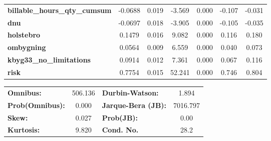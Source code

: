 \begin{center}
\begin{tabular}{lcccccc}
\textbf{billable\_hours\_qty\_cumsum}    &      -0.0688  &        0.019     &    -3.569  &         0.000        &       -0.107    &       -0.031     \\
\textbf{dnu}                             &      -0.0697  &        0.018     &    -3.905  &         0.000        &       -0.105    &       -0.035     \\
\textbf{holstebro}                       &       0.1479  &        0.016     &     9.082  &         0.000        &        0.116    &        0.180     \\
\textbf{ombygning}                       &       0.0564  &        0.009     &     6.559  &         0.000        &        0.040    &        0.073     \\
\textbf{kbyg33\_no\_limitations}         &       0.0914  &        0.012     &     7.361  &         0.000        &        0.067    &        0.116     \\
\textbf{risk}                            &       0.7754  &        0.015     &    52.241  &         0.000        &        0.746    &        0.804     \\
\bottomrule
\end{tabular}
\begin{tabular}{lclc}
\textbf{Omnibus:}       & 506.136 & \textbf{  Durbin-Watson:     } &    1.894  \\
\textbf{Prob(Omnibus):} &   0.000 & \textbf{  Jarque-Bera (JB):  } & 7016.797  \\
\textbf{Skew:}          &   0.027 & \textbf{  Prob(JB):          } &     0.00  \\
\textbf{Kurtosis:}      &   9.820 & \textbf{  Cond. No.          } &     28.2  \\
\bottomrule
\end{tabular}
\end{center}
